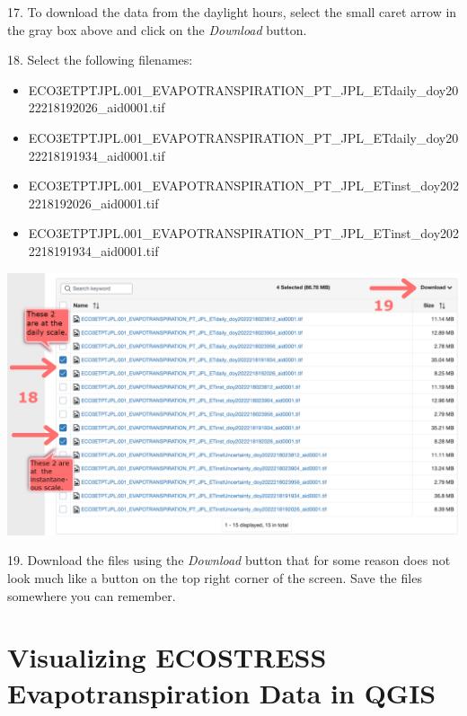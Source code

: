 \documentclass[oneside,a4paper,11pt,explicit]{book}
\begin{document}
17. To download the data from the daylight hours, select the small caret arrow in the gray box above and click on the \textit{Download} button.

18. Select the following filenames:

\begin{itemize}
	\item ECO3ETPTJPL.001\_EVAPOTRANSPIRATION\_PT\_JPL\_ETdaily\_doy2022218192026\_aid0001.tif
	\item ECO3ETPTJPL.001\_EVAPOTRANSPIRATION\_PT\_JPL\_ETdaily\_doy2022218191934\_aid0001.tif
	\item ECO3ETPTJPL.001\_EVAPOTRANSPIRATION\_PT\_JPL\_ETinst\_doy2022218192026\_aid0001.tif
	\item ECO3ETPTJPL.001\_EVAPOTRANSPIRATION\_PT\_JPL\_ETinst\_doy2022218191934\_aid0001.tif
\end{itemize}

\vspace{.5em}

\centerline{\includegraphics[width=.8\textwidth]{ETdownload.png}}

\vspace{.5em}


19. Download the files using the \textit{Download} button that for some reason does not look much like a button on the top right corner of the screen. Save the files somewhere you can remember. 

\section{Visualizing ECOSTRESS Evapotranspiration Data in QGIS}
\end{document}
